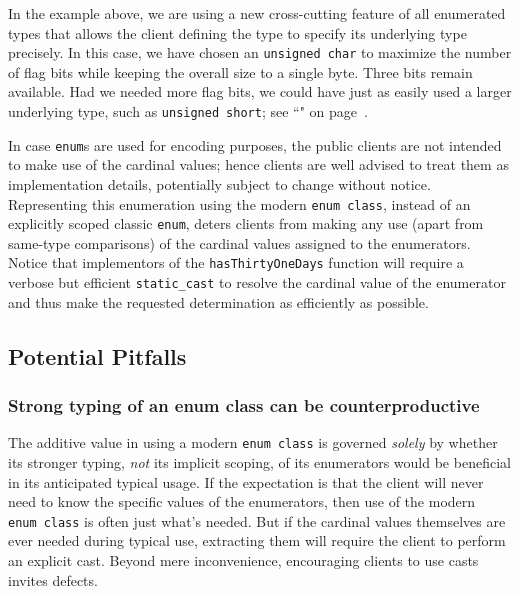 \noindent In the example above, we are using a new cross-cutting
feature of all enumerated types that allows the client defining the
type to specify its underlying type precisely. In this case, we have
chosen an \texttt{unsigned}~\texttt{char} to maximize the number of
flag bits while keeping the overall size to a single byte. Three bits
remain available. Had we needed more flag bits, we could have just as
easily used a larger underlying type, such as
  \texttt{unsigned}~\texttt{short}; see ``" on page~\pageref{explicit-enumeration-underlying-type}.

\noindent In case \texttt{enum}s are used for encoding purposes, the public clients are not intended to make use of the
cardinal values; hence clients are well advised to treat them as
implementation details, potentially subject to change without notice.
Representing this enumeration using the modern
\texttt{enum}~\texttt{class}, instead of an explicitly scoped classic
\texttt{enum}, deters clients from making any use (apart from same-type
comparisons) of the cardinal values assigned to the enumerators. Notice
that implementors of the \texttt{hasThirtyOneDays} function will require
a verbose but efficient \texttt{static\_cast} to resolve the
cardinal value of the enumerator and thus make the requested
determination as efficiently as possible.

\subsection[Potential Pitfalls]{Potential Pitfalls}\label{potential-pitfalls-enumclass}

\subsubsection[Strong typing of an {\tt enum} {\tt class} can be counterproductive]{Strong typing of an {\SubsubsecCode enum} {\SubsubsecCode class} can be counterproductive}\label{strong-typing-of-an-enum-class-can-be-counterproductive}

The additive value in using a modern \texttt{enum}~\texttt{class} is
governed \emph{solely} by whether its stronger typing, \emph{not} its
implicit scoping, of its enumerators would be beneficial in its
anticipated typical usage. If the expectation is that the client will
never need to know the specific values of the enumerators, then use
of the modern \texttt{enum}~\texttt{class} is often just what's needed.
But if the cardinal values themselves are ever needed during typical
use, extracting them will require the client to perform an explicit
cast. Beyond mere inconvenience, encouraging clients to use casts
invites defects.

